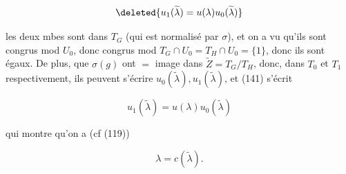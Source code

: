 
\[\deleted{u_1(\widetilde\lambda)=u(\lambda)u_0(\widetilde\lambda)}\]

  les deux mbes sont dans $T_G$ (qui est normalisé par $\sigma$), et on a vu qu'ils sont congrus mod $U_0$, donc congrus mod $T_G\cap U_0=T_H\cap U_0=\{1\}$, donc ils sont égaux. De plus,   que  $\sigma(g)$  ont $=$ image \inserted{$\widetilde\lambda$} dans $\widetilde Z=T_G/T_H$, donc,   dans $T_0$ et $T_1$ respectivement, ils peuvent s'écrire $u_0(\widetilde\lambda),u_1(\widetilde\lambda)$, et (141) s'écrit

\[u_1(\widetilde\lambda)=u(\lambda)u_0(\widetilde\lambda)\tag*{(142)}\]

qui montre qu'on a (cf (119))

\[\lambda=c(\widetilde\lambda).\tag*{(143)}\]

